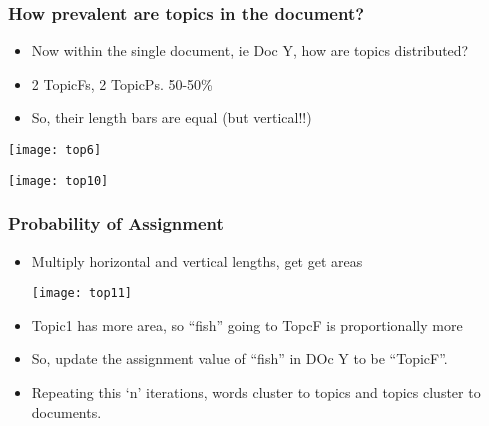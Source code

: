 \begin{frame}[fragile]\frametitle{How prevalent are topics in the document?}

  \begin{itemize}
  	\item Now within the single document, ie Doc Y, how are topics distributed?
	\item 2 TopicFs, 2 TopicPs. 50-50\%
	\item So, their length bars are equal (but vertical!!)
  \end{itemize}

\begin{center}
\texttt{[image: top6]}

\texttt{[image: top10]}
\end{center}


\end{frame}

\begin{frame}[fragile]\frametitle{Probability of Assignment }
  \begin{itemize}
	\item Multiply horizontal and vertical lengths, get get areas
	
\begin{center}
\texttt{[image: top11]}
\end{center}
\item Topic1 has more area, so ``fish'' going to TopcF is proportionally more
\item So, update the assignment value of ``fish'' in DOc Y to be ``TopicF''. 
\item Repeating this `n' iterations, words cluster to topics and topics cluster to documents.
  \end{itemize}
  
\end{frame}

